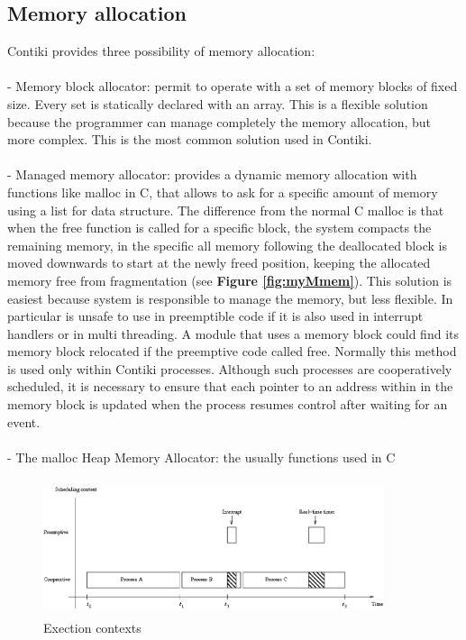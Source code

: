 \documentclass[a4paper,10pt]{article}
\begin{document}
\begin{multicols}{2}
 

\subsection{Memory allocation}

Contiki provides three possibility of \cite{support} memory allocation:\\\\
- Memory block allocator: permit to operate with a set of memory blocks of fixed size.
 Every set  is statically declared with an array. This is a flexible solution because the
 programmer can manage completely the memory allocation, but more complex. 
This is the most common solution used in Contiki.\\\\
- Managed memory allocator: provides a dynamic memory allocation with functions
 like malloc in C, that allows to ask for a specific amount of memory using a list for data structure.
The difference from the normal C malloc is that when the free function is called 
for a specific block, the system compacts the remaining memory, in the specific 
all memory following the deallocated block is moved downwards to start at the newly 
freed position, keeping the allocated memory free from fragmentation (see {\bf Figure \ref{fig:myMmem}}).
This solution is easiest because system is responsible to manage the memory,
 but less flexible. In particular is unsafe to use in preemptible code if it is also used
 in interrupt handlers or in multi threading. A module that uses a memory block could 
find its memory block relocated if the preemptive code called free. 
Normally this method is used only within Contiki processes. Although such processes are 
cooperatively scheduled, it is necessary to ensure that each pointer to an address
 within in the memory block is updated when the process resumes control after waiting for an event.\\\\
- The malloc Heap Memory Allocator: the usually functions used in C



\begin{figure}[t]
  \centering
 \includegraphics[width=10cm, height=4cm]{./eps/execution_contexts.eps}
\caption{Exection contexts}
 \label{fig:myfigure4}
\end{figure}

\end{multicols}
\end{document}
